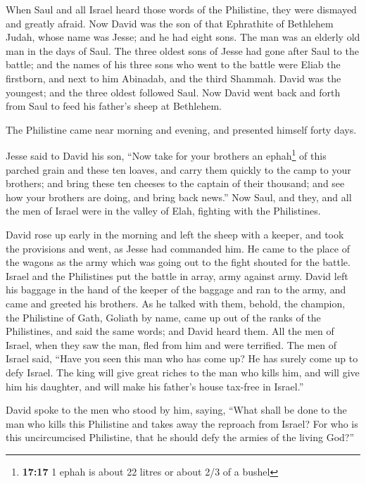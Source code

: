  When Saul and all Israel heard those words of the
Philistine, they were dismayed and greatly afraid.  Now
David was the son of that Ephrathite of Bethlehem Judah, whose name was
Jesse; and he had eight sons. The man was an elderly old man in the days
of Saul.  The three oldest sons of Jesse had gone after
Saul to the battle; and the names of his three sons who went to the
battle were Eliab the firstborn, and next to him Abinadab, and the third
Shammah.  David was the youngest; and the three oldest
followed Saul.  Now David went back and forth from Saul
to feed his father's sheep at Bethlehem.

 The Philistine came near morning and evening, and
presented himself forty days.

 Jesse said to David his son, ``Now take for your
brothers an ephah\footnote{\textbf{17:17} 1 ephah is about 22 litres or
  about 2/3 of a bushel} of this parched grain and these ten loaves, and
carry them quickly to the camp to your brothers;  and
bring these ten cheeses to the captain of their thousand; and see how
your brothers are doing, and bring back news.''  Now
Saul, and they, and all the men of Israel were in the valley of Elah,
fighting with the Philistines.

 David rose up early in the morning and left the sheep
with a keeper, and took the provisions and went, as Jesse had commanded
him. He came to the place of the wagons as the army which was going out
to the fight shouted for the battle.  Israel and the
Philistines put the battle in array, army against army. 
David left his baggage in the hand of the keeper of the baggage and ran
to the army, and came and greeted his brothers.  As he
talked with them, behold, the champion, the Philistine of Gath, Goliath
by name, came up out of the ranks of the Philistines, and said the same
words; and David heard them.  All the men of Israel, when
they saw the man, fled from him and were terrified.  The
men of Israel said, ``Have you seen this man who has come up? He has
surely come up to defy Israel. The king will give great riches to the
man who kills him, and will give him his daughter, and will make his
father's house tax-free in Israel.''

 David spoke to the men who stood by him, saying, ``What
shall be done to the man who kills this Philistine and takes away the
reproach from Israel? For who is this uncircumcised Philistine, that he
should defy the armies of the living God?''

